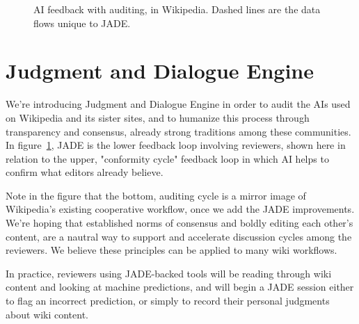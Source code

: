 \documentclass[format=sigconf]{acmart}
\begin{document}
\begin{figure}
\caption{AI feedback with auditing, in Wikipedia.  Dashed lines are the data flows unique to JADE.}\label{fig:audited}
\end{figure}

\section{Judgment and Dialogue Engine}

We're introducing Judgment and Dialogue Engine in order to audit the AIs used on Wikipedia and its sister sites, and to humanize this process through transparency and consensus, already strong traditions among these communities.  In figure~\ref{fig:audited}, JADE is the lower feedback loop involving reviewers, shown here in relation to the upper, "conformity cycle" feedback loop in which AI helps to confirm what editors already believe.

Note in the figure that the bottom, auditing cycle is a mirror image of Wikipedia's existing cooperative workflow, once we add the JADE improvements.  We're hoping that established norms of consensus and boldly editing each other's content, are a nautral way to support and accelerate discussion cycles among the reviewers.  We believe these principles can be applied to many wiki workflows.

In practice, reviewers using JADE-backed tools will be reading through wiki content and looking at machine predictions, and will begin a JADE session either to flag an incorrect prediction, or simply to record their personal judgments about wiki content.
\end{document}
